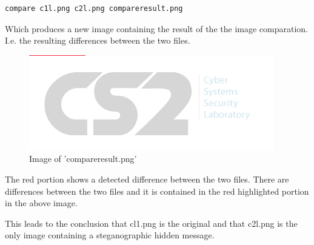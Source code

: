 \documentclass[a4paper,10pt,oneside]{article}
\begin{document}
\begin{lstlisting}
compare c1l.png c2l.png compareresult.png
\end{lstlisting}

Which produces a new image containing the result of the the image comparation. I.e. the resulting differences between the two files. 

\begin{figure}[ht]
	\includegraphics[width=\textwidth]{images/compareresult.png}
	\caption{Image of 'compareresult.png'}
	\centering
\end{figure}

The red portion shows a detected difference between the two files. There are differences between the two files and it is contained in the red highlighted portion in the above image.



This leads to the conclusion that cl1.png is the original and that c2l.png is the only image containing a steganographic hidden message.



%
%
\end{document}
